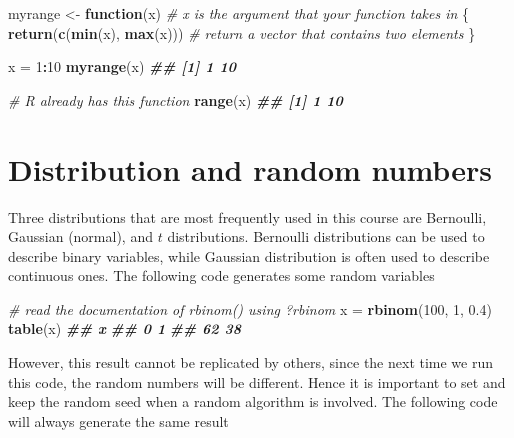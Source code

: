 \documentclass[
]{book}
\newenvironment{Shaded}{\begin{snugshade}}{\end{snugshade}}
\newcommand{\CommentTok}[1]{\textcolor[rgb]{0.56,0.35,0.01}{\textit{#1}}}
\newcommand{\ControlFlowTok}[1]{\textcolor[rgb]{0.13,0.29,0.53}{\textbf{#1}}}
\newcommand{\DecValTok}[1]{\textcolor[rgb]{0.00,0.00,0.81}{#1}}
\newcommand{\DocumentationTok}[1]{\textcolor[rgb]{0.56,0.35,0.01}{\textbf{\textit{#1}}}}
\newcommand{\FloatTok}[1]{\textcolor[rgb]{0.00,0.00,0.81}{#1}}
\newcommand{\FunctionTok}[1]{\textcolor[rgb]{0.13,0.29,0.53}{\textbf{#1}}}
\newcommand{\NormalTok}[1]{#1}
\newcommand{\OtherTok}[1]{\textcolor[rgb]{0.56,0.35,0.01}{#1}}
\newcommand{\SpecialCharTok}[1]{\textcolor[rgb]{0.81,0.36,0.00}{\textbf{#1}}}
\theoremstyle{definition}
\theoremstyle{definition}
\theoremstyle{definition}
\theoremstyle{definition}
\theoremstyle{remark}
\begin{document}
\begin{Shaded}
\begin{Highlighting}[]
\NormalTok{    myrange }\OtherTok{\textless{}{-}} \ControlFlowTok{function}\NormalTok{(x) }\CommentTok{\# x is the argument that your function takes in}
\NormalTok{    \{}
      \FunctionTok{return}\NormalTok{(}\FunctionTok{c}\NormalTok{(}\FunctionTok{min}\NormalTok{(x), }\FunctionTok{max}\NormalTok{(x))) }\CommentTok{\# return a vector that contains two elements}
\NormalTok{    \}}
  
\NormalTok{    x }\OtherTok{=} \DecValTok{1}\SpecialCharTok{:}\DecValTok{10}
    \FunctionTok{myrange}\NormalTok{(x)}
\DocumentationTok{\#\# [1]  1 10}
    
    \CommentTok{\# R already has this function}
    \FunctionTok{range}\NormalTok{(x)}
\DocumentationTok{\#\# [1]  1 10}
\end{Highlighting}
\end{Shaded}

\hypertarget{distribution-and-random-numbers}{%
\section{Distribution and random numbers}\label{distribution-and-random-numbers}}

Three distributions that are most frequently used in this course are Bernoulli, Gaussian (normal), and \(t\) distributions. Bernoulli distributions can be used to describe binary variables, while Gaussian distribution is often used to describe continuous ones. The following code generates some random variables

\begin{Shaded}
\begin{Highlighting}[]
    \CommentTok{\# read the documentation of rbinom() using ?rbinom}
\NormalTok{    x }\OtherTok{=} \FunctionTok{rbinom}\NormalTok{(}\DecValTok{100}\NormalTok{, }\DecValTok{1}\NormalTok{, }\FloatTok{0.4}\NormalTok{)}
    \FunctionTok{table}\NormalTok{(x)}
\DocumentationTok{\#\# x}
\DocumentationTok{\#\#  0  1 }
\DocumentationTok{\#\# 62 38}
\end{Highlighting}
\end{Shaded}

However, this result cannot be replicated by others, since the next time we run this code, the random numbers will be different. Hence it is important to set and keep the random seed when a random algorithm is involved. The following code will always generate the same result
\end{document}
